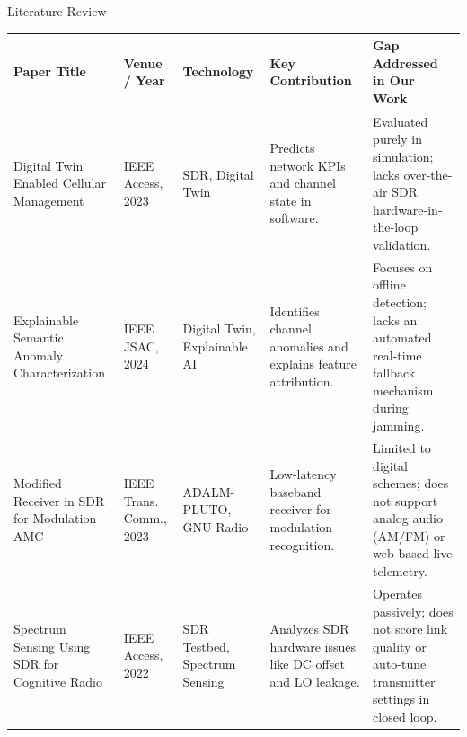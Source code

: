 \documentclass[aspectratio=169, 10pt]{beamer}
\begin{document}
\begin{frame}{Literature Review}
  \centering
  \scriptsize
  \begin{tabularx}{\linewidth}{p{2.5cm} p{1.6cm} p{2.1cm} X X}
    \toprule
    \textbf{Paper Title} & \textbf{Venue / Year} & \textbf{Technology} & \textbf{Key Contribution} & \textbf{Gap Addressed in Our Work} \\
    \midrule
    Digital Twin Enabled Cellular Management & IEEE Access, 2023 & SDR, Digital Twin & Predicts network KPIs and channel state in software. & Evaluated purely in simulation; lacks over-the-air SDR hardware-in-the-loop validation. \\
    \addlinespace
    Explainable Semantic Anomaly Characterization & IEEE JSAC, 2024 & Digital Twin, Explainable AI & Identifies channel anomalies and explains feature attribution. & Focuses on offline detection; lacks an automated real-time fallback mechanism during jamming. \\
    \addlinespace
    Modified Receiver in SDR for Modulation AMC & IEEE Trans. Comm., 2023 & ADALM-PLUTO, GNU Radio & Low-latency baseband receiver for modulation recognition. & Limited to digital schemes; does not support analog audio (AM/FM) or web-based live telemetry. \\
    \addlinespace
    Spectrum Sensing Using SDR for Cognitive Radio & IEEE Access, 2022 & SDR Testbed, Spectrum Sensing & Analyzes SDR hardware issues like DC offset and LO leakage. & Operates passively; does not score link quality or auto-tune transmitter settings in closed loop. \\
    \bottomrule
  \end{tabularx}
\end{frame}
\end{document}
